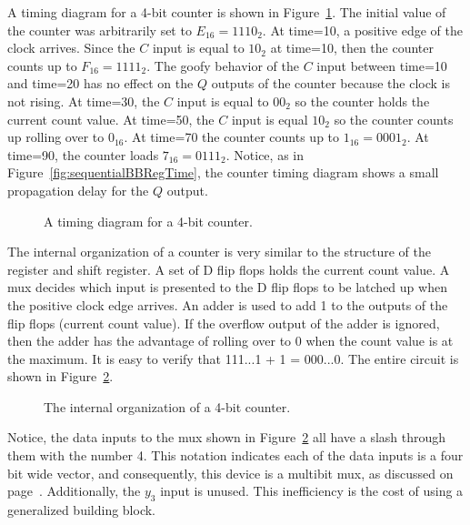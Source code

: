 A timing diagram for a 4-bit counter is shown in Figure~\ref{fig:sequentialBBCountTime}.
The initial value of the counter was arbitrarily set to $E_{16}=1110_2$.
At time=10, a positive edge of the clock arrives.  Since the $C$ input
is equal to $10_2$ at time=10, then the counter counts up to $F_{16}=1111_2$.
The goofy behavior of the $C$ input between time=10 and time=20 has
no effect on the $Q$ outputs of the counter because the clock is not rising.
At time=30, the $C$ input is equal to $00_2$ so the counter holds the current 
count value.  At time=50, the $C$ input is equal $10_2$ so the counter counts up
rolling over to $0_{16}$. At time=70 the counter counts up to $1_{16}=0001_2$.
At time=90, the counter loads $7_{16}=0111_2$.  Notice, as in 
Figure~\ref{fig:sequentialBBRegTime}, the counter timing diagram shows a small 
propagation delay for the $Q$ output.

\begin{figure}[ht]
\caption{A timing diagram for a 4-bit counter.}
\label{fig:sequentialBBCountTime}
\end{figure}

The internal organization of a counter is very similar to the structure of
the register and shift register.  A set of D flip flops holds the current
count value.  A mux decides which input is presented to the D flip flops
to be latched up when the positive clock edge arrives.  An adder is
used to add 1 to the outputs of the flip flops (current count value).  
If the overflow output of the adder is ignored, then the adder has the 
advantage of rolling over to 0 when the count value is at the 
maximum.  It is easy to verify that 111...1 + 1 = 000...0.  The 
entire circuit is shown in Figure~\ref{fig:sequentialBBcounter}.

\begin{figure}[ht]
\caption{The internal organization of a 4-bit counter.}
\label{fig:sequentialBBcounter}
\end{figure}

Notice, the data inputs to the mux shown in Figure~\ref{fig:sequentialBBcounter}
all have a slash through them with
the number 4.  This notation indicates each of the data inputs is a four
bit wide
vector, and consequently, this device is a multibit mux, as discussed on 
page~\pageref{page:wmu}.  Additionally, the $y_3$ input is unused.  This
inefficiency is the cost of using a generalized building block.  


